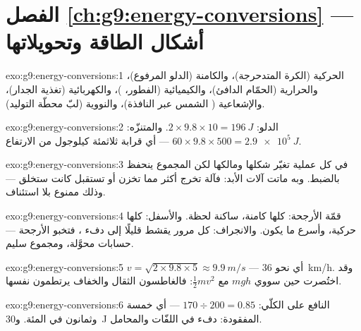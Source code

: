 \section*{الفصل \ref{ch:g9:energy-conversions} --- أشكال الطاقة وتحويلاتها}

\begin{solution}{exo:g9:energy-conversions:1}
الحركية (الكرة المتدحرجة)، والكامنة (الدلو المرفوع)،
والحرارية (الحمّام الدافئ)، والكيميائية (الفطور، )،
والكهربائية (تغذية الجدار)، والإشعاعية ( الشمس عبر
النافذة)، والنووية (لبّ محطّة التوليد).
\end{solution}

\begin{solution}{exo:g9:energy-conversions:2}
الدلو: $2 \times 9.8 \times 10 = \qty{196}{J}$. والمتنزّه:
$60 \times 9.8 \times 500 = \qty{2.9e5}{J}$ --- أي قرابة
ثلاثمئة كيلوجول من الارتفاع.
\end{solution}

\begin{solution}{exo:g9:energy-conversions:3}
في كل عملية تغيّر  شكلها ومالكها لكن المجموع ينحفظ
بالضبط. وبه ماتت آلات الأبد: فآلة تخرج أكثر مما تخزن أو تستقبل
كانت ستخلق  --- وذلك ممنوع بلا استئناف.
\end{solution}

\begin{solution}{exo:g9:energy-conversions:4}
قمّة الأرجحة: كلها كامنة، ساكنة لحظة. والأسفل: كلها حركية،
وأسرع ما يكون. والانجراف: كل مرور يقشط قليلًا إلى دفء 
، فتخبو الأرجحة --- حسابات محوَّلة، ومجموع سليم.
\end{solution}

\begin{solution}{exo:g9:energy-conversions:5}
$v = \sqrt{2 \times 9.8 \times 5} \approx \qty{9.9}{m/s}$ ---
أي نحو \qty{36}{km/h}. وقد اختُصرت  حين سووي $m g h$
مع $\frac12 m v^2$: فالغاطسون الثقال والخفاف يرتطمون 
نفسها.
\end{solution}

\begin{solution}{exo:g9:energy-conversions:6}
النافع على الكلّي: $170 \div 200 = 0.85$ --- أي خمسة وثمانون
في المئة. و\qty{30}{J} المفقودة: دفء في اللفّات والمحامل.
\end{solution}

